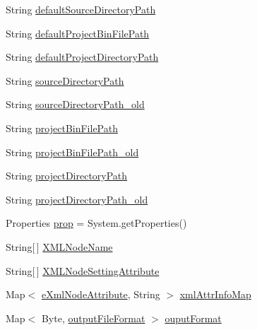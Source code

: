 \begin{DoxyCompactItemize}
\item 
String \hyperlink{class_microchip_m_p_f_s_1_1_main_m_p_f_s_ac3d1951443d32a1080f6c6a0461fb96b}{default\+Source\+Directory\+Path}
\item 
String \hyperlink{class_microchip_m_p_f_s_1_1_main_m_p_f_s_ac8ed47284c8260aa5e9624ffc1e52273}{default\+Project\+Bin\+File\+Path}
\item 
String \hyperlink{class_microchip_m_p_f_s_1_1_main_m_p_f_s_abc264631553d3bfab94dcf0cd9688f31}{default\+Project\+Directory\+Path}
\item 
String \hyperlink{class_microchip_m_p_f_s_1_1_main_m_p_f_s_abb6486032a587fb2d71ed7c59cf3d723}{source\+Directory\+Path}
\item 
String \hyperlink{class_microchip_m_p_f_s_1_1_main_m_p_f_s_ae115c70ca2044d43602051bad6dac6bb}{source\+Directory\+Path\+\_\+old}
\item 
String \hyperlink{class_microchip_m_p_f_s_1_1_main_m_p_f_s_a5c13397b795504abe1cc4d4661c40c5f}{project\+Bin\+File\+Path}
\item 
String \hyperlink{class_microchip_m_p_f_s_1_1_main_m_p_f_s_a984473c0956e782c177071828dc5e413}{project\+Bin\+File\+Path\+\_\+old}
\item 
String \hyperlink{class_microchip_m_p_f_s_1_1_main_m_p_f_s_a3ddb7f34e0326ea54914246b6e15bc5c}{project\+Directory\+Path}
\item 
String \hyperlink{class_microchip_m_p_f_s_1_1_main_m_p_f_s_a22845bce6cdfbd7f97f33b0e5582fb05}{project\+Directory\+Path\+\_\+old}
\item 
Properties \hyperlink{class_microchip_m_p_f_s_1_1_main_m_p_f_s_af00ddb1b1d61f3b675e6be958411b324}{prop} = System.\+get\+Properties()
\item 
String\mbox{[}$\,$\mbox{]} \hyperlink{class_microchip_m_p_f_s_1_1_main_m_p_f_s_a45fc014d7e6652c2efa9d14dbcbc65ca}{X\+M\+L\+Node\+Name}
\item 
String\mbox{[}$\,$\mbox{]} \hyperlink{class_microchip_m_p_f_s_1_1_main_m_p_f_s_a284bebc3990bf874495c63942e6d2584}{X\+M\+L\+Node\+Setting\+Attribute}
\item 
Map$<$ \hyperlink{enum_microchip_m_p_f_s_1_1_main_m_p_f_s_1_1e_xml_node_attribute}{e\+Xml\+Node\+Attribute}, String $>$ \hyperlink{class_microchip_m_p_f_s_1_1_main_m_p_f_s_a91f387893e3e59ab5ba08dc492b7db78}{xml\+Attr\+Info\+Map}
\item 
Map$<$ Byte, \hyperlink{enum_microchip_m_p_f_s_1_1_main_m_p_f_s_1_1output_file_format}{output\+File\+Format} $>$ \hyperlink{class_microchip_m_p_f_s_1_1_main_m_p_f_s_adfa006b2a7842cb08d71396d62c6ac9f}{ouput\+Format}

\end{DoxyCompactItemize}
